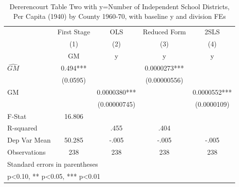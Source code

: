 \begin{table}[htbp]\centering
\def\sym#1{\ifmmode^{#1}\else\(^{#1}\)\fi}
\caption{Dererencourt Table Two with y=Number of Independent School Districts, Per Capita (1940) by County 1960-70, with baseline y and division FEs}
\begin{tabular}{l*{4}{c}}
\toprule
                    & First Stage   &         OLS   &Reduced Form   &        2SLS   \\
                    &\multicolumn{1}{c}{(1)}&\multicolumn{1}{c}{(2)}&\multicolumn{1}{c}{(3)}&\multicolumn{1}{c}{(4)}\\
                    &\multicolumn{1}{c}{GM}&\multicolumn{1}{c}{y}&\multicolumn{1}{c}{y}&\multicolumn{1}{c}{y}\\
\midrule
$\hat{GM}$          &       0.494***&               &   0.0000273***&               \\
                    &    (0.0595)   &               &(0.00000556)   &               \\
\addlinespace
GM                  &               &   0.0000380***&               &   0.0000552***\\
                    &               &(0.00000745)   &               & (0.0000109)   \\
\midrule
F-Stat              &      16.806   &               &               &               \\
R-squared           &               &        .455   &        .404   &               \\
Dep Var Mean        &      50.285   &       -.005   &       -.005   &       -.005   \\
Observations        &         238   &         238   &         238   &         238   \\
\bottomrule
\multicolumn{5}{l}{\footnotesize Standard errors in parentheses}\\
\multicolumn{5}{l}{\footnotesize * p<0.10, ** p<0.05, *** p<0.01}\\
\end{tabular}
\end{table}
